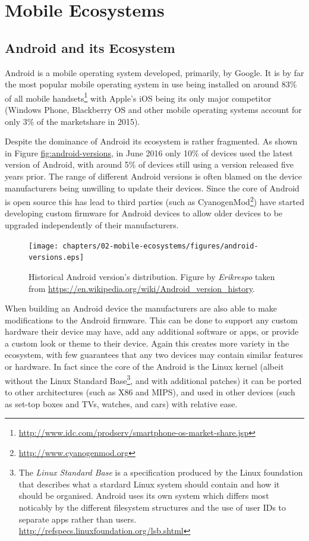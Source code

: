 \documentclass[thesis.tex]{subfiles}
\begin{document}
\chapter{Mobile Ecosystems}

\section{Android and its Ecosystem}\label{android-and-its-ecosystem}

Android is a mobile operating system developed, primarily, by Google. It
is by far the most popular mobile operating system in use being
installed on around 83\% of all mobile handsets\footnote{\url{http://www.idc.com/prodserv/smartphone-os-market-share.jsp}}
with Apple's iOS being its only major competitor (Windows Phone,
Blackberry OS and other mobile operating systems account for only 3\% of
the marketshare in 2015).

Despite the dominance of Android its ecosystem is rather fragmented. As
shown in Figure \url{fig:android-versions}, in June 2016 only 10\% of
devices used the latest version of Android, with around 5\% of devices
still using a version released five years prior. The range of different
Android versions is often blamed on the device manufacturers being
unwilling to update their devices. Since the core of Android is open
source this has lead to third parties (such as CyanogenMod\footnote{\url{http://www.cyanogenmod.org}})
have started developing custom firmware for Android devices to allow
older devices to be upgraded independently of their manufacturers.

\begin{figure}[htbp]
\centering
\texttt{[image: chapters/02-mobile-ecosystems/figures/android-versions.eps]}
\caption{Historical Android version's distribution. Figure by
\emph{Erikrespo} taken from
\url{https://en.wikipedia.org/wiki/Android_version_history}.}
\end{figure}

When building an Android device the manufacturers are also able to make
modifications to the Android firmware. This can be done to support any
custom hardware their device may have, add any additional software or
apps, or provide a custom look or theme to their device. Again this
creates more variety in the ecosystem, with few guarantees that any two
devices may contain similar features or hardware. In fact since the core
of the Android is the Linux kernel (albeit without the Linux Standard
Base\footnote{The \emph{Linux Standard Base} is a specification produced
  by the Linux foundation that describes what a stardard Linux system
  should contain and how it should be organised. Android uses its own
  system which differs most noticably by the different filesystem
  structures and the use of user IDs to separate apps rather than users.
  \url{http://refspecs.linuxfoundation.org/lsb.shtml}}, and with
additional patches) it can be ported to other architectures (such as X86
and MIPS), and used in other devices (such as set-top boxes and TVs,
watches, and cars) with relative ease.
\end{document}
